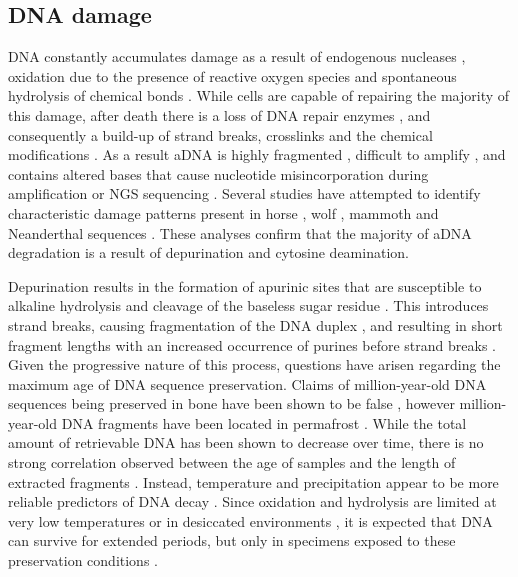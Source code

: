 \documentclass[12pt, a4paper]{article}
\begin{document}
\subsection{DNA damage}\label{sec:DNAdamage}
DNA constantly accumulates damage as a result of endogenous nucleases \cite{Briggs:2010aa}, oxidation due to the presence of reactive oxygen species \cite{Strand:2014aa} and spontaneous hydrolysis of chemical bonds \cite{Schroeder:2007aa,Hoss:1996aa}. 
While cells are capable of repairing the majority of this damage, after death there is a loss of DNA repair enzymes \cite{Lindahl:1993aa,Willerslev:2004ab}, and consequently a build-up of strand breaks, crosslinks and the chemical modifications \cite{Briggs:2007aa,Paabo:1989aa,Sawyer:2012aa}. 
As a result aDNA is highly fragmented \cite{Lindahl:1993,Briggs:2007aa}, difficult to amplify \cite{Willerslev:2004aa}, and contains altered bases that cause nucleotide misincorporation during amplification or NGS sequencing \cite{Stiller:2006aa}.
Several studies have attempted to identify characteristic damage patterns present in horse \cite{Orlando:2011aa}, wolf \cite{Stiller:2006aa}, mammoth and Neanderthal sequences \cite{Briggs:2007aa,Briggs:2010aa,Stiller:2006aa}.
These analyses confirm that the majority of aDNA degradation is a result of depurination and cytosine deamination.

Depurination results in the formation of apurinic sites that are susceptible to alkaline hydrolysis and cleavage of the baseless sugar residue \cite{Lindahl:1972aa,Lindahl:1993aa}. 
This introduces strand breaks, causing fragmentation of the DNA duplex \cite{Garcia-Garcera:2011aa}, and resulting in short fragment lengths with an increased occurrence of purines before strand breaks \cite{Briggs:2007aa}. 
Given the progressive nature of this process, questions have arisen regarding the maximum age of DNA sequence preservation. 
Claims of million-year-old DNA sequences being preserved in bone have been shown to be false \cite{Allentoft:2012aa}, however million-year-old DNA fragments have been located in permafrost \cite{Poinar:2006aa}. 
While the total amount of retrievable DNA has been shown to decrease over time, there is no strong correlation observed between the age of samples and the length of extracted fragments \cite{Sawyer:2012aa}. 
Instead, temperature and precipitation appear to be more reliable predictors of DNA decay \cite{Kistler:2017}. 
Since oxidation and hydrolysis are limited at very low temperatures or in desiccated environments \cite{Dabney:2013aa}, it is expected that DNA can survive for extended periods, but only in specimens exposed to these preservation conditions .
\end{document}

